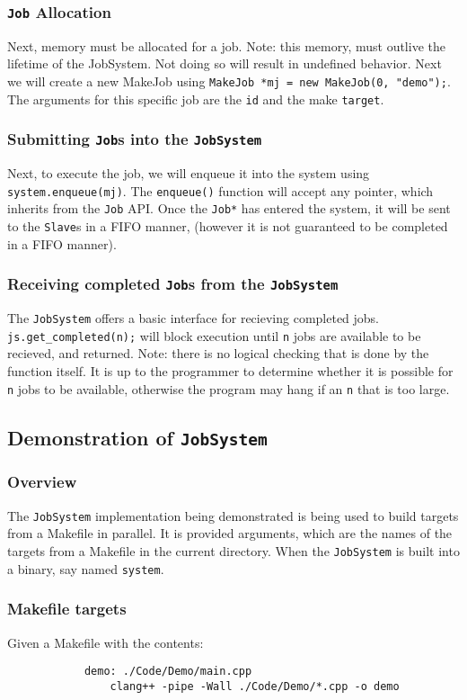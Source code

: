 \documentclass{article}
\begin{document}
		\subsubsection{\texttt{Job} Allocation}
			Next, memory must be allocated for a job. Note: this memory, must outlive the lifetime of the JobSystem. Not doing so will result in undefined behavior. Next we will create a new MakeJob using \texttt{MakeJob *mj = new MakeJob(0, "demo");}. The arguments for this specific job are the \texttt{id} and the make \texttt{target}. 
		\subsubsection{Submitting \texttt{Job}s into the \texttt{JobSystem}}
			Next, to execute the job, we will enqueue it into the system using \texttt{system.enqueue(mj)}. The \texttt{enqueue()} function will accept any pointer, which inherits from the \texttt{Job} API. Once the \texttt{Job*} has entered the system, it will be sent to the \texttt{Slave}s in a FIFO manner, (however it is not guaranteed to be completed in a FIFO manner).
		\subsubsection{Receiving completed \texttt{Job}s from the \texttt{JobSystem}}
			The \texttt{JobSystem} offers a basic interface for recieving completed jobs. \texttt{js.get\_completed(n);} will block execution until \texttt{n} jobs are available to be recieved, and returned. Note: there is no logical checking that is done by the function itself. It is up to the programmer to determine whether it is possible for \texttt{n} jobs to be available, otherwise the program may hang if an \texttt{n} that is too large.
	
	\subsection{Demonstration of \texttt{JobSystem}}
		\subsubsection{Overview}
			The \texttt{JobSystem} implementation being demonstrated is being used to build targets from a Makefile in parallel. It is provided arguments, which are the names of the targets from a Makefile in the current directory. When the \texttt{JobSystem} is built into a binary, say named \texttt{system}.
			
		\subsubsection{Makefile targets}
			Given a Makefile with the contents:
			\begin{verbatim}
			demo: ./Code/Demo/main.cpp
				clang++ -pipe -Wall ./Code/Demo/*.cpp -o demo
			\end{verbatim}
\end{document}
